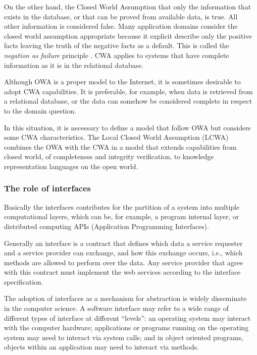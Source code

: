 \documentclass{singlecol-new}
\theoremstyle{TH}{
\newtheorem{lemma}{Lemma}
\newtheorem{theorem}[lemma]{Theorem}
\newtheorem{corrolary}[lemma]{Corrolary}
\newtheorem{conjecture}[lemma]{Conjecture}
\newtheorem{proposition}[lemma]{Proposition}
\newtheorem{claim}[lemma]{Claim}
\newtheorem{stheorem}[lemma]{Wrong Theorem}
\newtheorem{algorithm}{Algorithm}
}
\theoremstyle{THrm}{
\newtheorem{definition}{Definition}[section]
\newtheorem{question}{Question}[section]
\newtheorem{remark}{Remark}
\newtheorem{scheme}{Scheme}
}
\theoremstyle{THhit}{
\newtheorem{case}{Case}[section]
}
\begin{document}
On the other hand, the Closed World Assumption that only the information that exists in the database, or that can be proved from available data, is true. All other information is considered false. Many application domains consider the closed world assumption appropriate because it explicit describe only the positive facts leaving the truth of the negative facts as a default. This is called the \textit{negation as failure} principle \citep{clark1978negation}. CWA applies to systems that have complete information as it is in the relational database.

Although OWA is a proper model to the Internet, it is sometimes desirable to adopt CWA capabilities. 
It is preferable, for example, when data is retrieved from a relational database, or the data can somehow be considered complete in respect to the domain question.

In this situation, it is necessary to define a model that follow OWA but considers some CWA characteristics. The Local Closed World Assumption (LCWA) \citep{Sengupta2011} combines the OWA with the CWA in a model that extends capabilities from closed world, of completeness and integrity verification, to knowledge representation languages on the open world. 

\subsubsection{The role of interfaces}
Basically the interfaces contributes for the partition of a system into multiple computational layers, which can be, for example, a program internal layer, or distributed computing APIs (Application Programming Interfaces). 

Generally an interface is a contract that defines which data a service requester and a service provider can exchange, and how this exchange occurs, i.e., which methods are allowed to perform over the data. Any service provider that agree with this contract must implement the web services according to the interface specification.

The adoption of interfaces as a mechanism for abstraction is widely disseminate in the computer science. 
A software interface may refer to a wide range of different types of interface at different ``levels'': an operating system may interact with the computer hardware; applications or programs running on the operating system may need to interact via system calls; and in object oriented programs, objects within an application may need to interact via methods.
\end{document}
